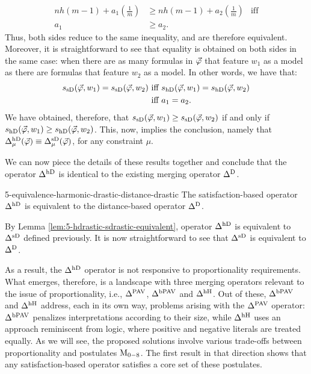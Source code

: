 \begin{prf*}{}{}
\begin{align*}
		nh(m-1)+a_1(\frac{1}{m})			&\geq nh(m-1)+a_2(\frac{1}{m})			&\text{iff}\\
		a_1									&\geq a_2.								&
	\end{align*}	
	Thus, both sides reduce to the same inequality, and are therefore equivalent.
	Moreover, it is straightforward to see that equality is obtained on both sides in the same case: when there are as
	many formulas in $\P$ that feature $w_1$ as a model as there are formulas that feature $w_2$ as a model.
	In other words, we have that:
	\begin{align*}
	\sat_\sdrastic(\P,w_1) = \sat_\sdrastic(\P,w_2)&~\text{iff}~
	\sat_\hdrastic(\P,w_1) = \sat_\hdrastic(\P,w_2)\\
	&~\text{iff}~a_1=a_2.
	\end{align*}
	We have obtained, therefore, that $\sat_\sdrastic(\P,w_1)\geq\sat_\sdrastic(\P,w_2)$ if and only if 
	$\sat_\hdrastic(\P,w_1)\geq\sat_\hdrastic(\P,w_2)$.
	This, now, implies the conclusion, namely that
	$\mer{\hdrastic}{\mu}(\P)\equiv\mer{\sdrastic}{\mu}(\P)$,
	for any constraint $\mu$.
\end{prf*}

We can now piece the details of these results together and 
conclude that the operator $\me^\hdrastic$ is identical
to the existing merging operator $\me^{\drastic}$.

\begin{thm}{}{5-equivalence-harmonic-drastic-distance-drastic}
	The satisfaction-based operator $\me^\hdrastic$ is equivalent 
	to the distance-based operator $\me^{\drastic}{}$.
\end{thm}
\begin{prf*}{}{}%
	By Lemma \ref{lem:5-hdrastic-sdrastic-equivalent}, operator $\mer{\hdrastic}{}$
	is equivalent to $\mer{\sdrastic}{}$ defined previously.
	It is now straightforward to see that $\mer{\sdrastic}{}$ is equivalent to $\mer{\drastic}{}$.
\end{prf*}

As a result, the $\me^\hdrastic$ operator is not responsive to proportionality requirements.
What emerges, therefore, is a landscape with three merging operators relevant to the issue of proportionality,
i.e., $\me^{\pav}$, $\me^{\bpav}$ and $\me^{\hhamming}{}$.
Out of these, $\me^{\bpav}$ and $\me^{\hhamming}{}$ address, each in its own way,
problems arising with the $\me^{\pav}$ operator: 
$\me^{\bpav}$ penalizes interpretations according to their size,
while $\me^{\hhamming}{}$ uses an approach reminiscent from logic,
where positive and negative literals are treated equally.
As we will see, 
the proposed solutions involve various trade-offs between
proportionality and postulates $\ppm{0-8}$.
The first result in that direction shows 
that any satisfaction-based operator satisfies a core set of these postulates.

